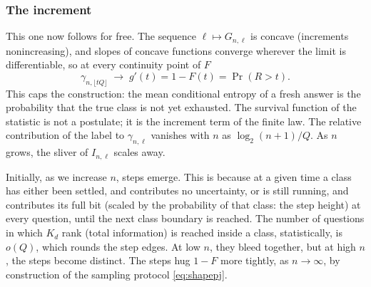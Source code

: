 \documentclass[11pt]{article}
\begin{document}
\subsubsection{The increment}

This one now follows for free. The sequence $\ell \mapsto G_{n,\ell}$ is
concave (increments nonincreasing), and slopes of concave functions
converge wherever the limit is differentiable, so at every continuity
point of $F$
%
\begin{equation}
  \gamma_{n,\lfloor tQ\rfloor}
  \;\longrightarrow\;
  g'(t) = 1 - F(t) = \Pr(R > t).
  \label{eq:gammaF}
\end{equation}
%
This caps the construction: the mean conditional entropy
of a fresh answer is the probability that the true class is not yet
exhausted. The survival function of the statistic is not a postulate;
it is the increment term of the finite law.
The relative contribution of the label to $\gamma_{n,\ell}$ vanishes with $n$ as
$\log_2(n+1)/Q$. As $n$ grows, the sliver of $I_{n,\ell}$ scales away.

Initially, as we increase $n$, steps emerge. This is because at a given time a class has
either been settled, and contributes no uncertainty, or is still running, and
contributes its full bit (scaled by the probability of that class: the step height) at every question, until the next class
boundary is reached. The number of questions in which $K_d$ rank (total information) is reached inside a class, statistically, is $o(Q)$, 
which rounds the step edges. At low $n$, they bleed together, but at high $n$, the steps become distinct.
The steps hug $1 - F$ more tightly, as $n \to \infty$, by construction of the sampling protocol \eqref{eq:shapepj}.
\end{document}

